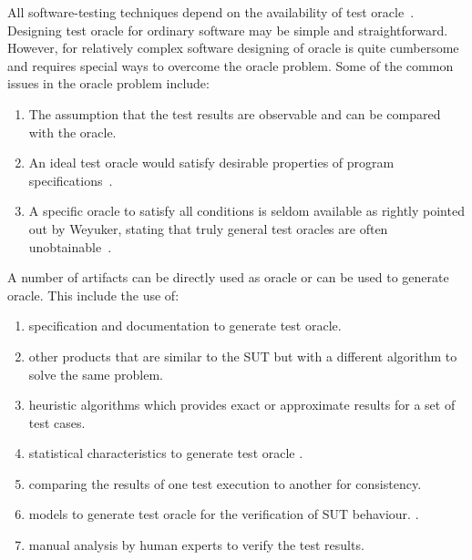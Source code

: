 All software-testing techniques depend on the availability of test oracle~\cite{gaudel2010software}. Designing test oracle for ordinary software may be simple and straightforward. However, for relatively complex software designing of oracle is quite cumbersome and requires special ways to overcome the oracle problem. Some of the common issues in the oracle problem include:
\begin{enumerate}
\item The assumption that the test results are observable and can be compared with the oracle.
\item An ideal test oracle would satisfy desirable properties of program specifications~\cite{baresi2001test}.
\item A specific oracle to satisfy all conditions is seldom available as rightly pointed out by Weyuker, stating that truly general test oracles are often unobtainable~\cite{weyuker1982testing}. 
\end{enumerate}

A number of artifacts can be directly used as oracle or can be used to generate oracle. This include the use of:
\begin{enumerate}
\item specification and documentation to generate test oracle. 
\item other products that are similar to the SUT but with a different algorithm to solve the same problem.
\item heuristic algorithms which provides exact or approximate results for a set of test cases. %
\item statistical characteristics to generate test oracle \cite{mayer2004test}. 
\item comparing the results of one test execution to another for consistency. %
\item models to generate test oracle for the verification of SUT behaviour. \cite{robinson1999finite}.
\item manual analysis by human experts to verify the test results\cite{jalote1997integrated}. 
\end{enumerate}

